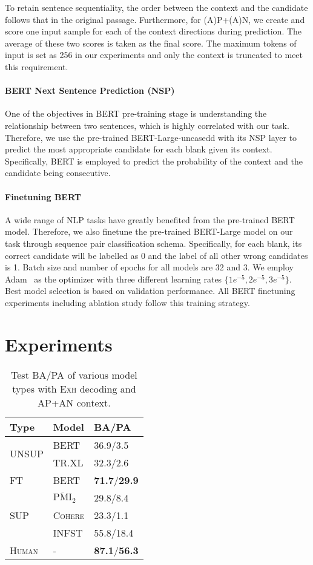 \documentclass[11pt,a4paper]{article}
\begin{document}
To retain sentence sequentiality, the order between the context and the candidate follows that in the original passage. Furthermore, for \textsc{(A)P+(A)N}, we create and score one input sample for each of the context directions during prediction. The average of these two scores is taken as the final score.
The maximum tokens of input is set as 256 in our experiments and only the context is truncated to meet this requirement.
\paragraph{BERT Next Sentence Prediction (NSP)}
One of the objectives in BERT pre-training stage is understanding the relationship between two sentences, which is highly correlated with our task. Therefore, we use the pre-trained BERT-Large-uncasedd  with its NSP layer to predict the most appropriate candidate for each blank given its context. Specifically, BERT is employed to predict the probability of the context and the candidate being consecutive. 
\paragraph{Finetuning BERT}
A wide range of NLP tasks have greatly benefited from the
pre-trained BERT model. Therefore, we also finetune the pre-trained BERT-Large model on our task through sequence pair classification schema. 
Specifically, for each blank, its correct candidate will be labelled as 0 and the label of all other wrong candidates is 1. Batch size and number of epochs for all models are 32 and 3. We employ Adam~\cite{kingma2014adam} as the optimizer with three different learning rates $\{1e^{-5}, 2e^{-5}, 3e^{-5}\}$. Best model selection is based on validation performance. All BERT finetuning experiments including ablation study follow this training strategy.
 
\section{Experiments}
\label{sec:experiments}
\begin{table}
\centering
\begin{tabular}{l l l}
\toprule
\bf Type & \bf Model & \bf{BA/PA}   \\ 
\midrule
\multirow{2}{*}{\textsc{UNSUP}} 
& \textsc{BERT} & 36.9/3.5   \\
  &\textsc{TR.XL} & 32.3/2.6 \\
 \midrule
\multirow{1}{*}{\textsc{FT}} & \textsc{BERT} &  \textbf{71.7}/\textbf{29.9}\\
 \midrule
  \multirow{3}{*}{\textsc{SUP}}
& \textsc{$\overline{\textrm{PMI}}_{2}$}  & 29.8/8.4    \\
& \textsc{\textsc{Cohere}} & 23.3/1.1    \\
& \textsc{INFST} & 55.8/18.4\\
\midrule
\multirow{1}{*}{\textsc{Human}}  
& -& \textbf{87.1}/\textbf{56.3}    \\
\bottomrule
\end{tabular}
\caption{Test \textsc{BA}/\textsc{PA} of various model types with \textsc{Exh} decoding and AP+AN context.}
\label{tab:apnres}
\end{table}
\end{document}
